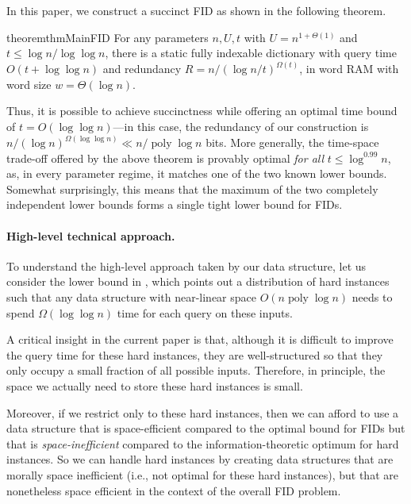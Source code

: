 \documentclass{article}
\theoremstyle{plain}
\theoremstyle{definition}  \newtheorem{definition}[theorem]{Definition}
\DeclareMathOperator{\poly}{poly}
\begin{document}
In this paper, we construct a succinct FID as shown in the following theorem.

\begin{restatable}{theorem}{thmMainFID}
  \label{thm:main-fid}
  For any parameters $n, U, t$ with $U = n^{1 + \Theta(1)}$ and $t \le \log n/\log\log n$, there is a static fully indexable dictionary with query time $O(t + \log \log n)$ and redundancy $R = n/(\log n/t)^{\Omega(t)}$, in word RAM with word size $w = \Theta(\log n)$.
\end{restatable}

Thus, it is possible to achieve succinctness while offering an optimal time bound of $t = O(\log \log n)$---in this case, the redundancy of our construction is $n / (\log n)^{\Omega(\log \log n)} \ll n / \poly \log n$ bits. More generally, the time-space trade-off offered by the above theorem is provably optimal \emph{for all} $t \le \log^{0.99} n$, as, in every parameter regime, it matches one of the two known lower bounds. Somewhat surprisingly, this means that the maximum of the two completely independent lower bounds forms a single tight lower bound for FIDs.

\paragraph{High-level technical approach.} To understand the high-level approach taken by our data structure, let us consider the lower bound in \cite{patrascu2006timespace}, which points out a distribution of hard instances such that any data structure with near-linear space $O(n \poly \log n)$ needs to spend $\Omega(\log \log n)$ time for each query on these inputs.

A critical insight in the current paper is that, although it is difficult to improve the query time for these hard instances, they are well-structured so that they only occupy a small fraction of all possible inputs. Therefore, in principle, the space we actually need to store these hard instances is small.

Moreover, if we restrict only to these hard instances, then we can afford to use a data structure that is space-efficient compared to the optimal bound for FIDs but that is \emph{space-inefficient} compared to the information-theoretic optimum for hard instances. So we can handle hard instances by creating data structures that are morally space inefficient (i.e., not optimal for these hard instances), but that are nonetheless space efficient in the context of the overall FID problem.
\end{document}
